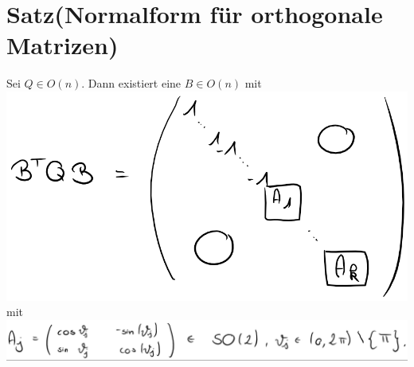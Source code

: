 \documentclass{scrbook}
\begin{document}
\section{Satz(Normalform für orthogonale Matrizen)}
Sei $ Q \in O(n)$. Dann existiert eine $B \in O(n)$ mit\\
\includegraphics{Satz_12_1_1.png}\\mit\\
\includegraphics[width=\textwidth]{Satz_12_1_2.png}
\end{document}
